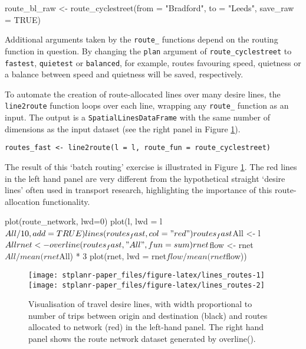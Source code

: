 \begin{Schunk}
\begin{Sinput}
route_bl_raw <- route_cyclestreet(from = "Bradford", to = "Leeds", save_raw = TRUE)
\end{Sinput}
\end{Schunk}

Additional arguments taken by the \texttt{route\_} functions depend on
the routing function in question. By changing the \texttt{plan} argument
of \texttt{route\_cyclestreet} to \texttt{fastest}, \texttt{quietest} or
\texttt{balanced}, for example, routes favouring speed, quietness or a
balance between speed and quietness will be saved, respectively.

To automate the creation of route-allocated lines over many desire
lines, the \texttt{line2route} function loops over each line, wrapping
any \texttt{route\_} function as an input. The output is a
\texttt{SpatialLinesDataFrame} with the same number of dimensions as the
input dataset (see the right panel in Figure \ref{fig:lines_routes}).

\begin{verbatim}
routes_fast <- line2route(l = l, route_fun = route_cyclestreet)
\end{verbatim}

The result of this `batch routing' exercise is illustrated in Figure
\ref{fig:lines_routes}. The red lines in the left hand panel are very
different from the hypothetical straight `desire lines' often used in
transport research, highlighting the importance of this route-allocation
functionality.

\begin{Schunk}
\begin{Sinput}
plot(route_network, lwd=0)
plot(l, lwd = l$All / 10, add = TRUE)
lines(routes_fast, col = "red")
routes_fast$All <- l$All
rnet <- overline(routes_fast, "All", fun = sum)
rnet$flow <- rnet$All / mean(rnet$All) * 3
plot(rnet, lwd = rnet$flow / mean(rnet$flow))
\end{Sinput}
\begin{figure}
\texttt{[image: stplanr-paper\_files/figure-latex/lines\_routes-1]} \texttt{[image: stplanr-paper\_files/figure-latex/lines\_routes-2]} \caption[Visualisation of travel desire lines, with width proportional to number of trips between origin and destination (black) and routes allocated to network  (red) in the left-hand panel]{Visualisation of travel desire lines, with width proportional to number of trips between origin and destination (black) and routes allocated to network  (red) in the left-hand panel. The right hand panel shows the route network dataset generated by overline().}\label{fig:lines_routes}
\end{figure}
\end{Schunk}

